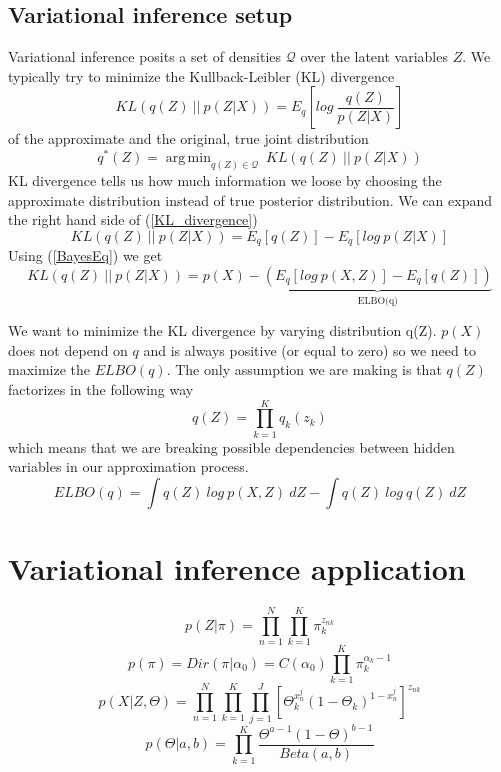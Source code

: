 \documentclass{article}
\newcommand\ProbSingleCoin{\Theta_k^{x_n^j}(1-\Theta_k)^{1-x_n^j}}
\newcommand\ProdK{\prod_{k=1}^{K}}
\newcommand\ProdN{\prod_{n=1}^{N}}
\newcommand\ProdJ{\prod_{j=1}^{J}}
\newcommand\Qfactor{\ProdK{q_k(z_k)}}
\DeclareMathOperator*{\argminA}{arg\,min}
\begin{document}
\subsection{Variational inference setup}
Variational inference posits a set of densities $\mathcal{Q}$  over the latent variables $Z$. We typically try to minimize the Kullback-Leibler (KL) divergence
\begin{equation}\label{KL_divergence}
    KL(q(Z)\: ||\: p(Z|X)) = E_{q}\left[log\:\frac{q(Z)}{p(Z|X)}\right]
\end{equation}
of the approximate and the original, true joint distribution
\begin{equation}
    q^*(Z) = \argminA_{q(Z)\in\mathcal{Q}}\: KL(q(Z)\: ||\: p(Z|X))
\end{equation}
KL divergence tells us how much information we loose by choosing the approximate distribution instead of true posterior distribution. 
We can expand the right hand side of (\ref{KL_divergence})
\begin{equation}
KL(q(Z)\: ||\: p(Z|X)) = E_q[q(Z)] - E_q[log\:p(Z|X)]
\end{equation}
Using (\ref{BayesEq}) we get
\begin{equation}
KL(q(Z)\: ||\: p(Z|X)) = p(X) - \underbrace{(E_q[log\:p(X,Z)] - E_q[q(Z)])}_\text{ELBO(q)}
\end{equation}

We want to minimize the KL divergence by varying distribution q(Z). $p(X)$ does not depend on $q$ and is always positive (or equal to zero) so we need to maximize the $ELBO(q)$. The only assumption we are making is that $q(Z)$ factorizes in the following way 
\begin{equation}
q(Z)=\Qfactor{}
\end{equation}
which means that we are breaking possible dependencies between hidden variables in our approximation process.
\begin{equation}
    ELBO(q) = \int q(Z)\: log\:{p(X,Z)}\:dZ - \int q(Z)\:log{\:q(Z)}\:dZ
\end{equation}

\section{Variational inference application}
\begin{equation}
    p(Z|\pi) = \ProdN \ProdK \pi_k^{z_{nk}}
\end{equation}
\begin{equation}
    p(\pi) = Dir(\pi|\alpha_0) = C(\alpha_0)\ProdK{}\pi_k^{\alpha_k-1}
\end{equation}
\begin{equation}
    p(X|Z,\Theta)= \ProdN\ProdK\ProdJ[\ProbSingleCoin{}]^{z_{nk}}
\end{equation}
\begin{equation}
    p(\Theta|a,b) = \ProdK\frac{\Theta^{a-1}(1-\Theta)^{b-1}}{Beta(a,b)}
\end{equation}
\end{document}
